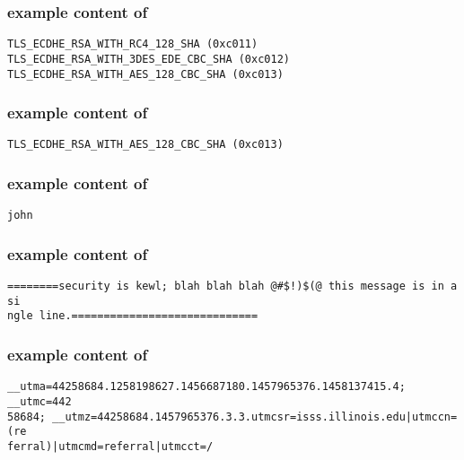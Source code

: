 \hypertarget{cslistformat}{}
\subsubsection*{example content of \texttt{\hyperlink{cp1cslist}{\filecslist}}}
\begin{mdframed}
\begin{Verbatim}
TLS_ECDHE_RSA_WITH_RC4_128_SHA (0xc011)
TLS_ECDHE_RSA_WITH_3DES_EDE_CBC_SHA (0xc012)
TLS_ECDHE_RSA_WITH_AES_128_CBC_SHA (0xc013)
\end{Verbatim}
\end{mdframed}

\hypertarget{servercsformat}{}
\subsubsection*{example content of \texttt{\hyperlink{cp1servercs}{\fileservercs}}}
\begin{mdframed}
\begin{Verbatim}
TLS_ECDHE_RSA_WITH_AES_128_CBC_SHA (0xc013)
\end{Verbatim}
\end{mdframed}

\hypertarget{nameformat}{}
\subsubsection*{example content of \texttt{\hyperlink{cp1name}{\filename}}}
\begin{mdframed}
\begin{Verbatim}
john
\end{Verbatim}
\end{mdframed}

\hypertarget{msgformat}{}
\subsubsection*{example content of \texttt{\hyperlink{cp1msg}{\filemsg}}}
\begin{mdframed}
\begin{Verbatim}
========security is kewl; blah blah blah @#$!)$(@ this message is in a si
ngle line.=============================
\end{Verbatim}
\end{mdframed}

\hypertarget{cookieformat}{}
\subsubsection*{example content of \texttt{\hyperlink{cp1cookie}{\filecookie}}}
\begin{mdframed}
\begin{Verbatim}
__utma=44258684.1258198627.1456687180.1457965376.1458137415.4; __utmc=442
58684; __utmz=44258684.1457965376.3.3.utmcsr=isss.illinois.edu|utmccn=(re
ferral)|utmcmd=referral|utmcct=/
\end{Verbatim}
\end{mdframed}


